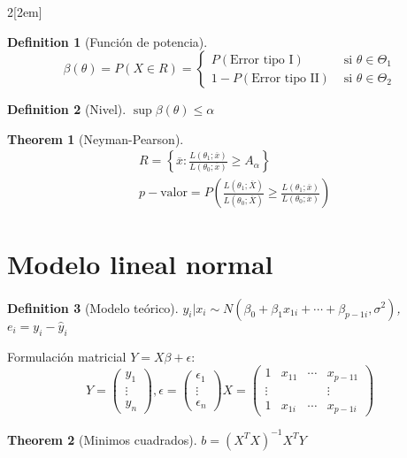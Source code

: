 \documentclass[leqno]{article}
\newtheorem*{theorem}{Theorem}
\newtheorem*{definition}{Definition}
\begin{document}
\begin{multicols}{2}[\columnsep2em]
\begin{definition}[Función de potencia]
\[
\beta (\theta ) = P(X\in R) = \begin{cases}
  P(\text{Error tipo I}) & \text{ si } \theta \in \Theta_1 \\
  1-P(\text{Error tipo II}) & \text{ si } \theta \in \Theta_2 
\end{cases}
\] 
\end{definition}

\begin{definition}[Nivel] $\sup \beta (\theta )\le \alpha $
\end{definition}

\begin{theorem}[Neyman-Pearson]
\begin{align*}
  & R = \left\{ \overline{x} : \frac{L(\theta _1;\overline{x})}{L(\theta _0;\overline{x})}\ge A_\alpha  \right\}\\
  & p-\text{valor} = P\left( \frac{L(\theta _1;\overline{X})}{L(\theta _0; \overline{X})}\ge \frac{L(\theta _1;\overline{x})}{L(\theta _0;\overline{x})} \right) 
\end{align*}

\end{theorem}





\section{Modelo lineal normal}

\begin{definition}[Modelo teórico] $y_i|x_i \sim N(\beta _0+ \beta_1x_{1i}+ \cdots + \beta_{p-1i}, \sigma ^2)$, $e_i = y_i-\hat{y}_i$
\end{definition}

Formulación matricial $Y = X\beta + \epsilon$:
\[
Y = \begin{pmatrix} y_1 \\ \vdots \\ y_n \end{pmatrix} , \epsilon = \begin{pmatrix} \epsilon_1\\ \vdots \\ \epsilon_n \end{pmatrix} 
X = \begin{pmatrix} 1 & x_{11} & \cdots & x_{p-11} \\ \vdots & & & \vdots \\ 1 & x_{1i} & \cdots & x_{p-1i} \end{pmatrix} 
\] 
\begin{theorem}[Minimos cuadrados] $ b = (X^TX)^{-1}X^TY$
\end{theorem}


\end{multicols}
\end{document}
